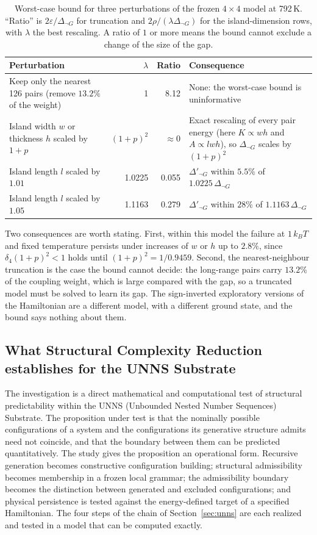 \documentclass[11pt,a4paper]{article}
\theoremstyle{plain}
\theoremstyle{definition}
\theoremstyle{remark}
\newcommand{\dnG}{\Delta_{\neg G}}
\newcommand{\kBT}{k_{B}T}
\begin{document}
\begin{table}[t]
\centering\small
\caption{Worst-case bound for three perturbations of the frozen $4\times4$ model at 792\,K. ``Ratio'' is $2\varepsilon/\Delta_{\neg G}$ for truncation and $2\rho/(\lambda\Delta_{\neg G})$ for the island-dimension rows, with $\lambda$ the best rescaling. A ratio of $1$ or more means the bound cannot exclude a change of the size of the gap.}
\label{tab:perturb}
\begin{tabularx}{\linewidth}{@{}p{4.4cm}rrX@{}}
\toprule
Perturbation & $\lambda$ & Ratio & Consequence\\
\midrule
Keep only the nearest 126 pairs (remove $13.2\%$ of the weight) & 1 & 8.12 & None: the worst-case bound is uninformative\\
Island width $w$ or thickness $h$ scaled by $1+p$ & $(1+p)^2$ & $\approx0$ & Exact rescaling of every pair energy (here $K\propto wh$ and $A\propto lwh$), so $\dnG$ scales by $(1+p)^2$\\
Island length $l$ scaled by $1.01$ & 1.0225 & 0.055 & $\Delta'_{\neg G}$ within $5.5\%$ of $1.0225\,\dnG$\\
Island length $l$ scaled by $1.05$ & 1.1163 & 0.279 & $\Delta'_{\neg G}$ within $28\%$ of $1.1163\,\dnG$\\
\bottomrule
\end{tabularx}
\end{table}

Two consequences are worth stating. First, within this model the failure at $1\,\kBT$ and fixed temperature persists under increases of $w$ or $h$ up to $2.8\%$, since $\delta_4(1+p)^2<1$ holds until $(1+p)^2=1/0.9459$. Second, the nearest-neighbour truncation is the case the bound cannot decide: the long-range pairs carry $13.2\%$ of the coupling weight, which is large compared with the gap, so a truncated model must be solved to learn its gap. The sign-inverted exploratory versions of the Hamiltonian are a different model, with a different ground state, and the bound says nothing about them.

\subsection{What Structural Complexity Reduction establishes for the UNNS Substrate}\label{sec:unnsestablishes}
The investigation is a direct mathematical and computational test of structural predictability within the UNNS (Unbounded Nested Number Sequences) Substrate. The proposition under test is that the nominally possible configurations of a system and the configurations its generative structure admits need not coincide, and that the boundary between them can be predicted quantitatively. The study gives the proposition an operational form. Recursive generation becomes constructive configuration building; structural admissibility becomes membership in a frozen local grammar; the admissibility boundary becomes the distinction between generated and excluded configurations; and physical persistence is tested against the energy-defined target of a specified Hamiltonian. The four steps of the chain of Section~\ref{sec:unns} are each realized and tested in a model that can be computed exactly.
\end{document}
